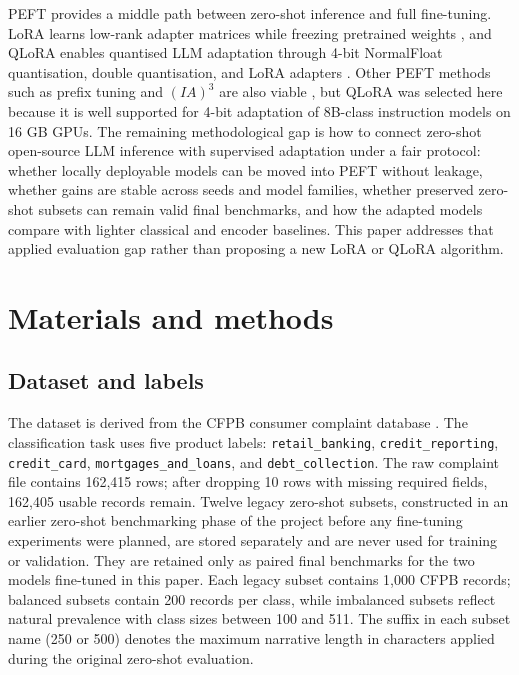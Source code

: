 \documentclass{elektr}
\begin{document}
PEFT provides a middle path between zero-shot inference and full fine-tuning. LoRA learns low-rank adapter matrices while freezing pretrained weights \cite{hu2022lora}, and QLoRA enables quantised LLM adaptation through 4-bit NormalFloat quantisation, double quantisation, and LoRA adapters \cite{dettmers2023qlora}. Other PEFT methods such as prefix tuning and $(IA)^3$ are also viable \cite{li2021prefix,liu2022fewshot}, but QLoRA was selected here because it is well supported for 4-bit adaptation of 8B-class instruction models on 16 GB GPUs. The remaining methodological gap is how to connect zero-shot open-source LLM inference with supervised adaptation under a fair protocol: whether locally deployable models can be moved into PEFT without leakage, whether gains are stable across seeds and model families, whether preserved zero-shot subsets can remain valid final benchmarks, and how the adapted models compare with lighter classical and encoder baselines. This paper addresses that applied evaluation gap rather than proposing a new LoRA or QLoRA algorithm.

\section{Materials and methods}

\subsection{Dataset and labels}

The dataset is derived from the CFPB consumer complaint database \cite{cfpbdata}. The classification task uses five product labels: \texttt{retail\_banking}, \texttt{credit\_reporting}, \texttt{credit\_card}, \texttt{mortgages\_and\_loans}, and \texttt{debt\_collection}. The raw complaint file contains 162,415 rows; after dropping 10 rows with missing required fields, 162,405 usable records remain. Twelve legacy zero-shot subsets, constructed in an earlier zero-shot benchmarking phase of the project before any fine-tuning experiments were planned, are stored separately and are never used for training or validation. They are retained only as paired final benchmarks for the two models fine-tuned in this paper. Each legacy subset contains 1,000 CFPB records; balanced subsets contain 200 records per class, while imbalanced subsets reflect natural prevalence with class sizes between 100 and 511. The suffix in each subset name (250 or 500) denotes the maximum narrative length in characters applied during the original zero-shot evaluation.
\end{document}
